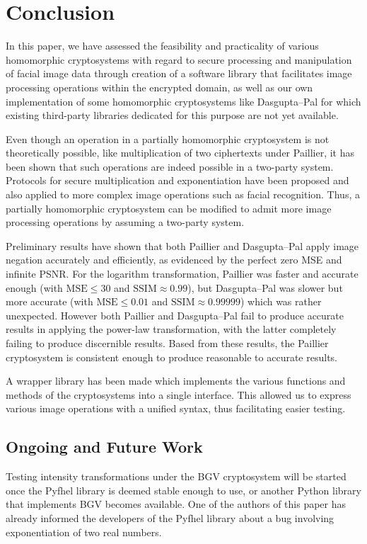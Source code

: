 \section{Conclusion}
In this paper, we have assessed the feasibility and practicality of various homomorphic cryptosystems with regard to secure processing and manipulation of facial image data through creation of a software library that facilitates image processing operations within the encrypted domain, as well as our own implementation of some homomorphic cryptosystems like Dasgupta--Pal for which existing third-party libraries dedicated for this purpose are not yet available.


Even though an operation in a partially homomorphic cryptosystem is not theoretically possible, like multiplication of two ciphertexts under Paillier, it has been shown that such operations are indeed possible in a two-party system. Protocols for secure multiplication and exponentiation have been proposed and also applied to more complex image operations such as facial recognition. Thus, a partially homomorphic cryptosystem can be modified to admit more image processing operations by assuming a two-party system.

Preliminary results have shown that both Paillier and Dasgupta--Pal apply image negation accurately and efficiently, as evidenced by the perfect zero MSE and infinite PSNR. For the logarithm transformation, Paillier was faster and accurate enough (with $\text{MSE} \le 30$ and $\text{SSIM} \approx 0.99$), but Dasgupta--Pal was slower but more accurate (with $\text{MSE} \le 0.01$ and $\text{SSIM} \approx 0.99999$) which was rather unexpected. However both Paillier and Dasgupta--Pal fail to produce accurate results in applying the power-law transformation, with the latter completely failing to produce discernible results. Based from these results, the Paillier cryptosystem is consistent enough to produce reasonable to accurate results.

A wrapper library has been made which implements the various functions and methods of the cryptosystems into a single interface. This allowed us to express various image operations with a unified syntax, thus facilitating easier testing.

\subsection{Ongoing and Future Work}
Testing intensity transformations under the BGV cryptosystem will be started once the Pyfhel library is deemed stable enough to use, or another Python library that implements BGV becomes available. 
One of the authors of this paper has already informed the developers of the Pyfhel library about a bug involving exponentiation of two real numbers. 

